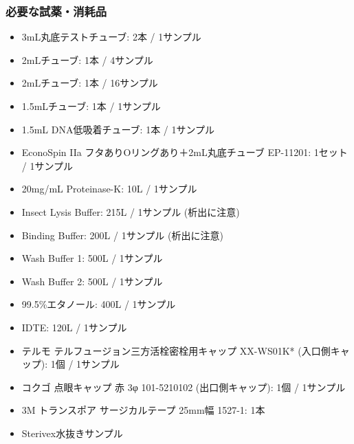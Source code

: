 \documentclass[titlepage,10pt,a4paper,uplatex]{jsbook}
\begin{document}
\subsubsection{必要な試薬・消耗品}
\begin{itemize}
\item 3mL丸底テストチューブ: 2本 / 1サンプル
\item 2mLチューブ: 1本 / 4サンプル
\item 2mLチューブ: 1本 / 16サンプル
\item 1.5mLチューブ: 1本 / 1サンプル
\item 1.5mL DNA低吸着チューブ: 1本 / 1サンプル
\item EconoSpin IIa フタありOリングあり＋2mL丸底チューブ EP-11201: 1セット / 1サンプル
\item 20mg/mL Proteinase-K: 10{\textmu}L / 1サンプル
\item Insect Lysis Buffer: 215{\textmu}L / 1サンプル (析出に注意)
\item Binding Buffer: 200{\textmu}L / 1サンプル (析出に注意)
\item Wash Buffer 1: 500{\textmu}L / 1サンプル
\item Wash Buffer 2: 500{\textmu}L / 1サンプル
\item 99.5\%エタノール: 400{\textmu}L / 1サンプル
\item IDTE: 120{\textmu}L / 1サンプル
\item テルモ テルフュージョン三方活栓密栓用キャップ XX-WS01K* (入口側キャップ): 1個 / 1サンプル
\item コクゴ 点眼キャップ 赤 3φ 101-5210102 (出口側キャップ): 1個 / 1サンプル
\item 3M トランスポア サージカルテープ 25mm幅 1527-1: 1本
\item Sterivex水抜きサンプル
\end{itemize}
\end{document}
